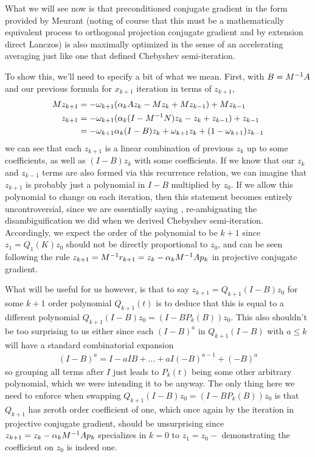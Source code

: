 \documentclass[11pt]{article}
\begin{document}
What we will see now is that preconditioned conjugate gradient in the form provided by Meurant (noting of course that this must be a mathematically equivalent process to orthogonal projection conjugate gradient and by extension direct Lanczos) is also maximally optimized in the sense of an accelerating averaging just like one that defined Chebyshev semi-iteration.

To show this, we'll need to specify a bit of what we mean. First, with $B = M^{-1} A$ and our previous formula for $x_{k+1}$ iteration in terms of $z_{k+1}$, \begin{align*}
Mz_{k+1} &= - \omega_{k+1}(\alpha_k A z_k - Mz_k + Mz_{k-1}) + Mz_{k-1} \\
z_{k+1} &= - \omega_{k+1}(\alpha_k (I - M^{-1} N) z_k - z_k + z_{k-1}) + z_{k-1} \\
&= -\omega_{k+1} \alpha_k (I - B) z_k + \omega_{k+1} z_k + (1- \omega_{k+1})z_{k-1}
\end{align*}
we can see that each $z_{k+1}$ is a linear combination of previous $z_k$ up to some coefficients, as well as $(I-B)z_k$ with some coefficients. If we know that our $z_k$ and $z_{k-1}$ terms are also formed via this recurrence relation, we can imagine that $z_{k+1}$ is probably just a polynomial in $I - B$ multiplied by $z_0$. If we allow this polynomial to change on each iteration, then this statement becomes entirely uncontroversial, since we are essentially saying , re-ambiguating the disambiguification we did when we derived Chebyshev semi-iteration. Accordingly, we expect the order of the polynomial to be $k+1$ since $z_1 = Q_1(K) z_0$ should not be directly proportional to $z_0$, and can be seen following the rule $z_{k+1} = M^{-1} r_{k+1} = z_k - \alpha_k M^{-1} A p_k$ in projective conjugate gradient.

What will be useful for us however, is that to say $z_{k+1} = Q_{k+1}(I - B) z_0$ for some $k+1$ order polynomial $Q_{k+1}(t)$ is to deduce that this is equal to a different polynomial $Q_{k+1}(I - B) z_0 = (I - B P_k(B)) z_0$. This also shouldn't be too surprising to us either since each $(I - B)^a$ in $Q_{k+1}(I - B)$ with $a \le k$ will have a standard combinatorial expansion \begin{gather*}
(I - B)^a = I - a IB + ... + a I(-B)^{a-1} + (-B)^a 
\end{gather*}
so grouping all terms after $I$ just leads to $P_k(t)$ being some other arbitrary polynomial, which we were intending it to be anyway. The only thing here we need to enforce when swapping $Q_{k+1}(I - B) z_0 = (I - B P_k(B)) z_0$ is that $Q_{k+1}$ has zeroth order coefficient of one, which once again by the iteration in projective conjugate gradient, should be unsurprising since $z_{k+1} = z_k - \alpha_k M^{-1} A p_k$ specializes in $k=0$ to $z_1 = z_0 - $ demonstrating the coefficient on $z_0$ is indeed one.
\end{document}
